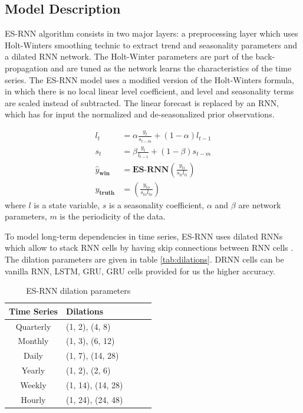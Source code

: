 \documentclass{article}
\begin{document}
\subsection{Model Description}

ES-RNN algorithm consists in two major layers: a preprocessing layer which uses Holt-Winters smoothing technic to extract trend and seasonality parameters and a dilated RNN network.
The Holt-Winter parameters are part of the back-propagation and are tuned as the network learns the characteristics of the time series. The ES-RNN model uses a modified version of the Holt-Winters formula,
in which there is no local linear level coefficient, and level and seasonality terms are scaled instead of subtracted. 
The linear forecast is replaced by an RNN, which has for input the normalized and de-seasonalized prior observations. 


\begin{align*}
	l_t 	&= \alpha \frac{y_t} {s_{t-m}} + (1-\alpha) l_{t-1} \\
	s_t 	&= \beta \frac{y_t}{l_{t-1}} + (1-\beta) s_{t-m} \\
	\hat{y}_{\textbf{win}}		&= \textbf{ES-RNN}(\frac{y_{ti}}{s_{ti} l_{ti}}) \\
	y_{\textbf{truth}}		&= (\frac{y_{to}}{s_{to} l_{to}}) 
\end{align*}
where $l$ is a state variable, $s$ is a seasonality coefficient, $\alpha$ and $\beta$ are network parameters, $m$ is the periodicity of the data.

To model long-term dependencies in time series, ES-RNN uses dilated RNNs  \cite{DBLP:journals/corr/abs-1710-02224} which allow to stack RNN cells by having skip connections between RNN cells . 
The dilation parameters  are given in table \autoref{tab:dilations}.  DRNN cells can be vanilla RNN, LSTM, GRU,  GRU cells provided for us the higher accuracy.

\begin{table}[!ht]
	\centering
	\begin{tabular}{clclc} \toprule
		\textbf{Time Series} & \textbf{Dilations} \\ 
		\midrule
		Quarterly  & (1, 2), (4, 8)	\\
		\midrule
		Monthly 	& (1, 3), (6, 12)	\\
		\midrule
		Daily 	& (1, 7), (14, 28)	\\
		\midrule		
		Yearly 	& (1, 2), (2, 6) 	\\
		\midrule		
		Weekly 	& (1, 14), (14, 28)	\\
		\midrule		
		Hourly 	& (1, 24), (24, 48)	\\
	\end{tabular}
	\caption{ES-RNN dilation parameters}
	\label{tab:dilations}
\end{table}
\end{document}
